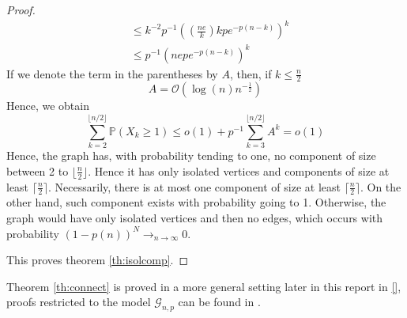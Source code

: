 \begin{proof}
\begin{align}
			   &\leq k^{-2}p^{-1}((\frac{ne}{k}) k p e^{-p(n-k)})^k\\
			   &\leq p^{-1}(nep e^{-p(n-k)})^k
\end{align}
If we denote the term in the parentheses by $A$, then, if $k \leq \frac{n}{2}$
\begin{equation}
    A = \mathcal{O}(\log(n) n^{-\frac{1}{2}})
\end{equation}
Hence, we obtain
\begin{equation}
	\sum_{k=2}^{\lfloor n/2\rfloor} \mathbb{P}(X_k \geq 1)\leq o(1) + p^{-1}\sum_{k=3}^{\lfloor n/2\rfloor} A^k = o(1)
\end{equation}
Hence, the graph has, with probability tending to one, no component of size between 2 to $\lfloor \frac{n}{2} \rfloor$.
Hence it has only isolated vertices and components of size at least $\lceil \frac{n}{2} \rceil$.
Necessarily, there is at most one component of size at least $\lceil \frac{n}{2} \rceil$.
\newline
On the other hand, such component exists with probability going to 1. Otherwise, the graph would have only isolated vertices and then no edges, which occurs with probability $(1-p(n))^N \longrightarrow_{n\to \infty} 0$.

This proves theorem \eqref{th:isolcomp}.
\end{proof}

Theorem \eqref{th:connect} is proved in a more general setting later in this report in \ref{}, proofs restricted to the model $\mathcal{G}_{n,p}$ can be found in \cite{JLR}.


